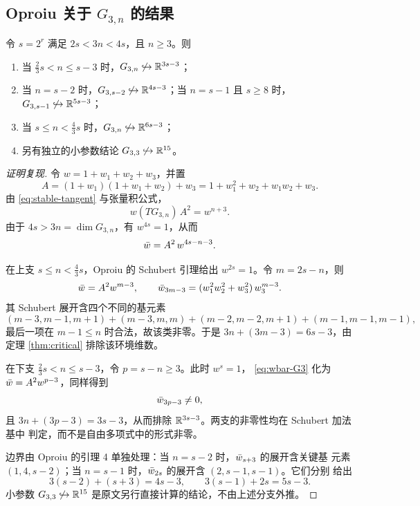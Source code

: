 \subsection{Oproiu 关于 $G_{3,n}$ 的结果}

\begin{theorem}\label{thm:oproiu-G3}
令 $s=2^{r}$ 满足 $2s<3n<4s$，且 $n\ge3$。则
\begin{enumerate}[label=(\alph*),leftmargin=2.2em]
  \item 当 $\tfrac23s<n\le s-3$ 时，$G_{3,n}\not\hookrightarrow\mathbb{R}^{3s-3}$；
  \item 当 $n=s-2$ 时，$G_{3,s-2}\not\hookrightarrow\mathbb{R}^{4s-3}$；当 $n=s-1$ 且 $s\ge8$ 时，
        $G_{3,s-1}\not\hookrightarrow\mathbb{R}^{5s-3}$；
  \item 当 $s\le n<\tfrac43s$ 时，$G_{3,n}\not\hookrightarrow\mathbb{R}^{6s-3}$；
  \item 另有独立的小参数结论 $G_{3,3}\not\hookrightarrow\mathbb{R}^{15}$。
\end{enumerate}
\end{theorem}

\begin{proof}[证明复现]
令 $w=1+w_1+w_2+w_3$，并置
\begin{equation*}
  A=(1+w_1)(1+w_1+w_2)+w_3=1+w_1^{2}+w_2+w_1w_2+w_3 .
\end{equation*}
由 \eqref{eq:stable-tangent} 与张量积公式，
\begin{equation*}
  w(TG_{3,n})\,A^{2}=w^{n+3}.
\end{equation*}
由于 $4s>3n=\dim G_{3,n}$，有 $w^{4s}=1$，从而
\begin{equation}
  \bar w=A^{2}\,w^{4s-n-3}. \label{eq:wbar-G3}
\end{equation}

在上支 $s\le n<\tfrac43s$，Oproiu 的 Schubert 引理给出 $w^{2s}=1$。令
$m=2s-n$，则
\begin{equation*}
  \bar w=A^{2}w^{m-3},
  \qquad
  \bar w_{3m-3}=(w_1^{2}w_2^{2}+w_3^{2})\,w_3^{m-3}.
\end{equation*}
其 Schubert 展开含四个不同的基元素
\begin{equation*}
  (m-3,m-1,m+1)+(m-3,m,m)+(m-2,m-2,m+1)+(m-1,m-1,m-1),
\end{equation*}
最后一项在 $m-1\le n$ 时合法，故该类非零。于是 $3n+(3m-3)=6s-3$，由定理
\ref{thm:critical} 排除该环境维数。

在下支 $\tfrac23s<n\le s-3$，令 $p=s-n\ge3$。此时 $w^{s}=1$，
\eqref{eq:wbar-G3} 化为 $\bar w=A^{2}w^{p-3}$，同样得到
\begin{equation*}
  \bar w_{3p-3}\neq0,
\end{equation*}
且 $3n+(3p-3)=3s-3$，从而排除 $\mathbb{R}^{3s-3}$。两支的非零性均在 Schubert 加法基中
判定，而不是自由多项式中的形式非零。

边界由 Oproiu 的引理 4 单独处理：当 $n=s-2$ 时，$\bar w_{s+3}$ 的展开含关键基
元素 $(1,4,s-2)$；当 $n=s-1$ 时，$\bar w_{2s}$ 的展开含 $(2,s-1,s-1)$。它们分别
给出
\begin{equation*}
  3(s-2)+(s+3)=4s-3,
  \qquad
  3(s-1)+2s=5s-3 .
\end{equation*}
小参数 $G_{3,3}\not\hookrightarrow\mathbb{R}^{15}$ 是原文另行直接计算的结论，不由上述分支外推。
\end{proof}

